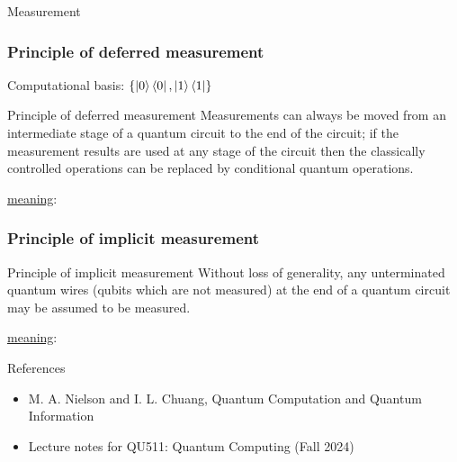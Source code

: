 \documentclass[9pt]{beamer}
\begin{document}
    \begin{section}{Measurement}
        \begin{frame}
            \frametitle{Principle of deferred measurement}
            Computational basis: $\{\ket 0 \bra 0 , \ket 1 \bra 1\}$
            \begin{block}{Principle of deferred measurement}
                Measurements can always be moved from an intermediate stage of a quantum circuit to the end of the circuit; if the measurement results are used at any stage of the circuit then the classically controlled operations can be replaced by conditional quantum operations.
            \end{block}
            \vspace{0.2cm}
            \checkmark \underline{meaning}:
        \end{frame}

        \begin{frame}
            \frametitle{Principle of implicit measurement}
            \begin{block}{Principle of implicit measurement}
                Without loss of generality, any  unterminated quantum wires (qubits which are not measured) at the end of a quantum circuit may be assumed to be measured.
            \end{block}
            \vspace{0.2cm}
            \checkmark \underline{meaning}:
        
        \end{frame}
    \end{section}
    

    
    \begin{frame}{References}
        
        \begin{itemize}
            \item M. A. Nielson and I. L. Chuang, Quantum Computation and Quantum Information
            \item Lecture notes for QU511: Quantum Computing (Fall 2024)
        \end{itemize}
        \vspace{6cm}
    \end{frame}
\end{document}
